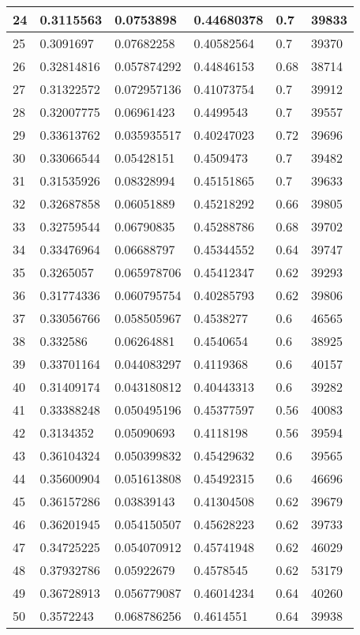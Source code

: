 \begin{longtable}{|l|l|l|l|l|l|}
24 & 0.3115563 & 0.0753898 & 0.44680378 & 0.7 & 39833 \\ \hline 
25 & 0.3091697 & 0.07682258 & 0.40582564 & 0.7 & 39370 \\ \hline 
26 & 0.32814816 & 0.057874292 & 0.44846153 & 0.68 & 38714 \\ \hline 
27 & 0.31322572 & 0.072957136 & 0.41073754 & 0.7 & 39912 \\ \hline 
28 & 0.32007775 & 0.06961423 & 0.4499543 & 0.7 & 39557 \\ \hline 
29 & 0.33613762 & 0.035935517 & 0.40247023 & 0.72 & 39696 \\ \hline 
30 & 0.33066544 & 0.05428151 & 0.4509473 & 0.7 & 39482 \\ \hline 
31 & 0.31535926 & 0.08328994 & 0.45151865 & 0.7 & 39633 \\ \hline 
32 & 0.32687858 & 0.06051889 & 0.45218292 & 0.66 & 39805 \\ \hline 
33 & 0.32759544 & 0.06790835 & 0.45288786 & 0.68 & 39702 \\ \hline 
34 & 0.33476964 & 0.06688797 & 0.45344552 & 0.64 & 39747 \\ \hline 
35 & 0.3265057 & 0.065978706 & 0.45412347 & 0.62 & 39293 \\ \hline 
36 & 0.31774336 & 0.060795754 & 0.40285793 & 0.62 & 39806 \\ \hline 
37 & 0.33056766 & 0.058505967 & 0.4538277 & 0.6 & 46565 \\ \hline 
38 & 0.332586 & 0.06264881 & 0.4540654 & 0.6 & 38925 \\ \hline 
39 & 0.33701164 & 0.044083297 & 0.4119368 & 0.6 & 40157 \\ \hline 
40 & 0.31409174 & 0.043180812 & 0.40443313 & 0.6 & 39282 \\ \hline 
41 & 0.33388248 & 0.050495196 & 0.45377597 & 0.56 & 40083 \\ \hline 
42 & 0.3134352 & 0.05090693 & 0.4118198 & 0.56 & 39594 \\ \hline 
43 & 0.36104324 & 0.050399832 & 0.45429632 & 0.6 & 39565 \\ \hline 
44 & 0.35600904 & 0.051613808 & 0.45492315 & 0.6 & 46696 \\ \hline 
45 & 0.36157286 & 0.03839143 & 0.41304508 & 0.62 & 39679 \\ \hline 
46 & 0.36201945 & 0.054150507 & 0.45628223 & 0.62 & 39733 \\ \hline 
47 & 0.34725225 & 0.054070912 & 0.45741948 & 0.62 & 46029 \\ \hline 
48 & 0.37932786 & 0.05922679 & 0.4578545 & 0.62 & 53179 \\ \hline 
49 & 0.36728913 & 0.056779087 & 0.46014234 & 0.64 & 40260 \\ \hline 
50 & 0.3572243 & 0.068786256 & 0.4614551 & 0.64 & 39938 \\ \hline 
\end{longtable}